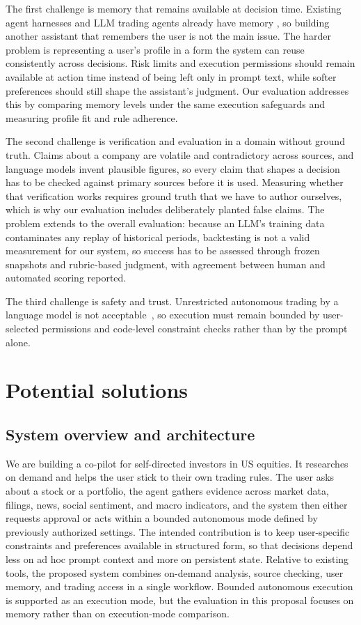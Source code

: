 \documentclass{article}
\begin{document}
The first challenge is memory that remains available at decision time. Existing agent harnesses and LLM trading agents already have memory
\citep{memgpt,finmem,tradinggpt}, so building another assistant that remembers the user is not
the main issue. The harder problem is representing a user's profile in a form the system can
reuse consistently across decisions. Risk limits and execution permissions should remain available at
action time instead of being left only in prompt text, while softer preferences should still shape the
assistant's judgment. Our evaluation addresses this by comparing memory levels under the same
execution safeguards and measuring profile fit and rule adherence.

The second challenge is verification and evaluation in a domain without ground truth. Claims about
a company are volatile and contradictory across sources, and language models invent plausible
figures, so every claim that shapes a decision has to be checked against primary sources before it
is used.
Measuring whether that verification works requires ground truth that we have to author ourselves,
which is why our evaluation includes deliberately planted false claims. The problem extends to the
overall evaluation: because an LLM's training data contaminates any replay of historical periods,
backtesting is not a valid measurement for our system, so success has to be assessed through frozen
snapshots and rubric-based judgment, with agreement between human and automated scoring reported.

The third challenge is safety and trust. Unrestricted autonomous trading by a language model is
not acceptable~\citep{amodei}, so execution must remain bounded by user-selected permissions and
code-level constraint checks rather than by the prompt alone.

\section{Potential solutions}

\subsection{System overview and architecture}

We are building a co-pilot for self-directed investors in US equities. It researches on demand
and helps the user stick to their own trading rules. The user asks about a stock or a portfolio,
the agent gathers evidence across market data, filings, news, social sentiment, and macro
indicators, and the system then either requests approval or acts within a bounded autonomous mode
defined by previously authorized settings. The intended contribution is to keep user-specific constraints and preferences
available in structured form, so that decisions depend less on ad hoc prompt context and more on
persistent state. Relative to existing tools, the proposed system combines on-demand analysis,
source checking, user memory, and trading access in a single workflow. Bounded autonomous
execution is supported as an execution mode, but the evaluation in this proposal focuses on memory
rather than on execution-mode comparison.
\end{document}

